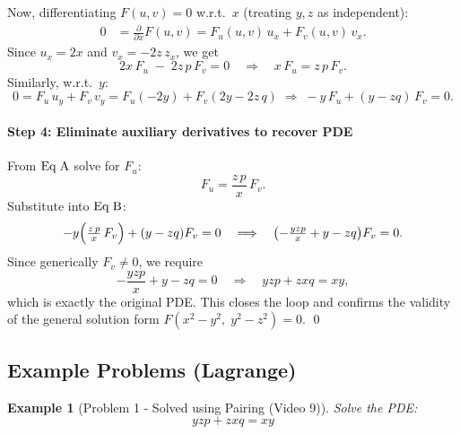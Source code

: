 \documentclass{article}
\newtheorem{example}{Example}[section]    %
\theoremstyle{remark}
\begin{document}
	Now, differentiating $F(u,v)=0$ w.r.t.\ $x$ (treating $y,z$ as independent):
	\begin{align*}
		0 & = \frac{\partial}{\partial x}F(u,v)
		= F_u(u,v)\,u_x + F_v(u,v)\,v_x.
	\end{align*}
	Since $u_x=2x$ and $v_x=-2z\,z_x$, we get
	\[
	2x\,F_u \;-\;2z\,p\,F_v =0
	\quad\Longrightarrow\quad
	x\,F_u = z\,p\,F_v. \tag{Eq A}
	\]
	Similarly, w.r.t.\ $y$:
	\[
	0 = F_u\,u_y + F_v\,v_y
	= F_u(-2y) + F_v(2y -2z\,q)
	\;\Longrightarrow\;
	-y\,F_u + (y - zq)\,F_v =0. \tag{Eq B}
	\]
	
	\paragraph{Step 4: Eliminate auxiliary derivatives to recover PDE}
	From \(\rm Eq\;A\) solve for $F_u$:
	\[
	F_u = \frac{z\,p}{x}\,F_v.
	\]
	Substitute into \(\rm Eq\;B\):
	\[
	-y\Bigl(\tfrac{z\,p}{x}\,F_v\Bigr)+(y - zq)F_v=0
	\quad\Longrightarrow\quad
	\bigl(-\tfrac{y z p}{x} + y - zq\bigr)F_v=0.
	\]
	Since generically $F_v\neq0$, we require
	\[
	-\frac{y z p}{x} + y - zq = 0
	\quad\Longrightarrow\quad
	y z p + z x q = x y,
	\]
	which is exactly the original PDE.  This closes the loop and confirms the validity of the general solution form $F(x^2-y^2,\;y^2-z^2)=0$. \qed
	
	\subsection{Example Problems (Lagrange)}
	
	\begin{example}[Problem 1 - Solved using Pairing (Video 9)]
		\label{ex:lagrange1}
		Solve the PDE:
		\[ yzp + zxq = xy \]
	\end{example}
	
\end{document}
